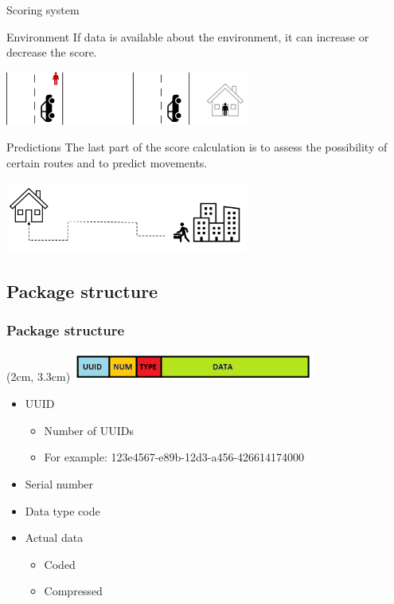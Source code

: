 \documentclass{beamer}
\begin{document}
\begin{frame}{Scoring system}
        \begin{block}{Environment}
            If data is available about the environment, it can increase or decrease the score.
        \end{block}
        \vspace{0.1cm}
        \centering
        \includegraphics[width=0.6\textwidth]{pics/environment}
        \vspace{0.5cm}
        \begin{block}{Predictions}
            The last part of the score calculation is to assess the possibility of certain routes and to predict movements.
        \end{block}
        \centering
        \includegraphics[width=0.6\textwidth]{pics/route_prediction}

\end{frame}

\subsection{Package structure}

\begin{frame}
    \frametitle{Package structure}
    \begin{textblock*}{5cm}(2cm, 3.3cm) %
        \includegraphics[width=8cm]{pics/Package structure.png}
    \end{textblock*}
    \begin{itemize}
        \item UUID
            \begin{itemize}
                \item Number of UUIDs
                \item For example:  123e4567-e89b-12d3-a456-426614174000
            \end{itemize}
        \item Serial number
        \item Data type code
        \item Actual data
            \begin{itemize}
                \item Coded
                \item Compressed
            \end{itemize}
    \end{itemize}
\end{frame}
\end{document}
